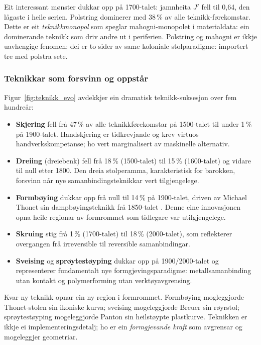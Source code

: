 \documentclass[10pt, a4paper, twocolumn]{article}
\begin{document}
Eit interessant mønster dukkar opp på 1700-talet: jamnheita $J'$ fell til 0,64, den lågaste i heile serien. Polstring dominerer med 38\,\% av alle teknikk-førekomstar. Dette er eit \emph{teknikkmonopol} som speglar mahogni-monopolet i materialdata: ein dominerande teknikk som driv andre ut i periferien. Polstring og mahogni er ikkje uavhengige fenomen; dei er to sider av same koloniale stolparadigme: importert tre med polstra sete.

\subsubsection{Teknikkar som forsvinn og oppstår}

Figur~\ref{fig:teknikk_evo} avdekkjer ein dramatisk teknikk-suksesjon over fem hundreår:

\begin{itemize}
  \item \textbf{Skjering} fell frå 47\,\% av alle teknikkførekomstar på 1500-talet til under 1\,\% på 1900-talet. Handskjering er tidkrevjande og krev virtuos handverkskompetanse; ho vert marginalisert av maskinelle alternativ.
  \item \textbf{Dreiing} (dreiebenk) fell frå 18\,\% (1500-talet) til 15\,\% (1600-talet) og vidare til null etter 1800. Den dreia stolperamma, karakteristisk for barokken, forsvinn når nye samanbindingsteknikkar vert tilgjengelege.
  \item \textbf{Formbøying} dukkar opp frå null til 14\,\% på 1900-talet, driven av Michael Thonet sin dampbøyingsteknikk frå 1850-talet \citep{thonet1976}. Denne eine innovasjonen opna heile regionar av formrommet som tidlegare var utilgjengelege.
  \item \textbf{Skruing} stig frå 1\,\% (1700-talet) til 18\,\% (2000-talet), som reflekterer overgangen frå irreversible til reversible samanbindingar.
  \item \textbf{Sveising} og \textbf{sprøytestøyping} dukkar opp på 1900/2000-talet og representerer fundamentalt nye formgjevingsparadigme: metallsamanbinding utan kontakt og polymerforming utan verktøyavgrensing.
\end{itemize}

Kvar ny teknikk opnar ein ny region i formrommet. Formbøying mogleggjorde Thonet-stolen sin ikoniske kurva; sveising mogeleggjorde Breuer sin røyrstol; sprøytestøyping mogeleggjorde Panton sin heilstøypte plastkurve. Teknikken er ikkje ei implementeringsdetalj; ho er ein \emph{formgjevande kraft} som avgrensar og mogeleggjer geometriar.
\end{document}
